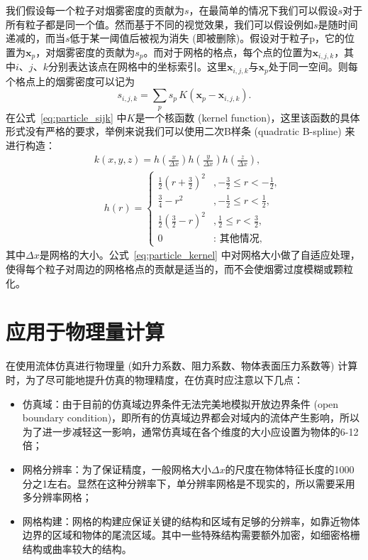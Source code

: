 我们假设每一个粒子对烟雾密度的贡献为$s$，在最简单的情况下我们可以假设$s$对于所有粒子都是同一个值。然而基于不同的视觉效果，我们可以假设例如$s$是随时间递减的，而当$s$低于某一阈值后被视为消失 (即被删除)。假设对于粒子p，它的位置为$\mathbf{x}_p$，对烟雾密度的贡献为$s_p$。而对于网格的格点，每个点的位置为$\mathbf{x}_{i,j,k}$，其中$i$、$j$、$k$分别表达该点在网格中的坐标索引。这里$\mathbf{x}_{i,j,k}$与$\mathbf{x}_p$处于同一空间。则每个格点上的烟雾密度可以记为
\begin{equation}
    s_{i,j,k}=\sum_p s_p \, K(\mathbf{x}_p-\mathbf{x}_{i,j,k}).
    \label{eq:particle_sijk}
\end{equation}
在公式~\ref{eq:particle_sijk} 中$K$是一个核函数 (kernel function)，这里该函数的具体形式没有严格的要求，举例来说我们可以使用二次B样条 (quadratic B-spline) 来进行构造：
\begin{align}
\label{eq:particle_kernel}
& k(x, y, z)= h\left(\frac{x}{\Delta x}\right) h\left(\frac{y}{\Delta x}\right) h\left(\frac{z}{\Delta x}\right), \\
& \quad h(r)=\left\{\begin{array}{cl}
\frac{1}{2}\left(r+\frac{3}{2}\right)^{2} & ,-\frac{3}{2} \leq r<-\frac{1}{2}, \\
\frac{3}{4}-r^{2} & ,-\frac{1}{2} \leq r<\frac{1}{2}, \\
\frac{1}{2}\left(\frac{3}{2}-r\right)^{2} & ,\frac{1}{2} \leq r<\frac{3}{2}, \\
0 & : \text { 其他情况, }
\end{array}\right.
\end{align}
其中$\Delta x$是网格的大小。公式~\ref{eq:particle_kernel} 中对网格大小做了自适应处理，使得每个粒子对周边的网格格点的贡献是适当的，而不会使烟雾过度模糊或颗粒化。

\section{应用于物理量计算}
\label{sec:pp_surface_pressure}
在使用流体仿真进行物理量 (如升力系数、阻力系数、物体表面压力系数等) 计算时，为了尽可能地提升仿真的物理精度，在仿真时应注意以下几点：
\begin{itemize}
    \item 仿真域：由于目前的仿真域边界条件无法完美地模拟开放边界条件 (open boundary condition)，即所有的仿真域边界都会对域内的流体产生影响，所以为了进一步减轻这一影响，通常仿真域在各个维度的大小应设置为物体的6-12倍；
    \item 网格分辨率：为了保证精度，一般网格大小$\Delta x$的尺度在物体特征长度的1000分之1左右。显然在这种分辨率下，单分辨率网格是不现实的，所以需要采用多分辨率网格；
    \item 网格构建：网格的构建应保证关键的结构和区域有足够的分辨率，如靠近物体边界的区域和物体的尾流区域。其中一些特殊结构需要额外加密，如细密格栅结构或曲率较大的结构。
  \end{itemize}

